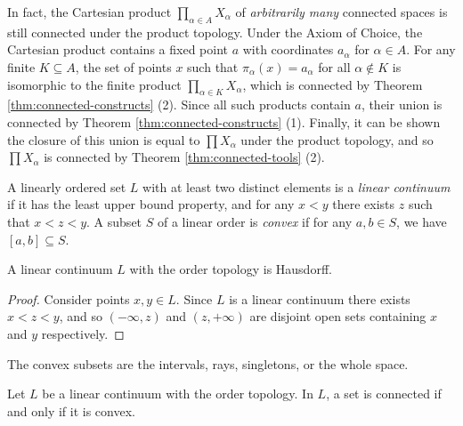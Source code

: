 \begin{rmk}
    In fact, the Cartesian product $\prod_{\alpha\in A}X_{\alpha}$ of \emph{arbitrarily many} connected spaces is still connected under the product topology. Under the Axiom of Choice, the Cartesian product contains a fixed point $a$ with coordinates $a_{\alpha}$ for $\alpha \in A$. For any finite $K \subseteq A$, the set of points $x$ such that $\pi_{\alpha}(x) = a_{\alpha}$ for all $\alpha \not\in K$ is isomorphic to the finite product $\prod_{\alpha\in K}X_{\alpha}$, which is connected by Theorem \ref{thm:connected-constructs} (2). Since all such products contain $a$, their union is connected by Theorem \ref{thm:connected-constructs} (1). Finally, it can be shown the closure of this union is equal to $\prod X_{\alpha}$ under the product topology, and so $\prod X_{\alpha}$ is connected by Theorem \ref{thm:connected-tools} (2).
\end{rmk}

\begin{defn}
    A linearly ordered set $L$ with at least two distinct elements is a \emph{linear continuum} if it has the least upper bound property, and for any $x < y$ there exists $z$ such that $x < z < y$. A subset $S$ of a linear order is \emph{convex} if for any $a, b \in S$, we have $[a, b] \subseteq S$.
\end{defn}

\begin{lemma}\label{lemma:linear-continuum-hausdorff}
    A linear continuum $L$ with the order topology is Hausdorff.
\end{lemma}

\begin{proof}
    Consider points $x, y \in L$. Since $L$ is a linear continuum there exists $x < z < y$, and so $(-\infty, z)$ and $(z, +\infty)$ are disjoint open sets containing $x$ and $y$ respectively.
\end{proof}

\begin{rmk}
    The convex subsets are the intervals, rays, singletons, or the whole space.
\end{rmk}

\begin{prop}
    Let $L$ be a linear continuum with the order topology. In $L$, a set is connected if and only if it is convex.
\end{prop}

